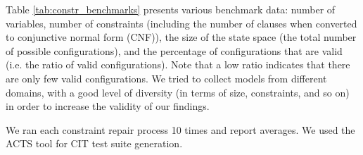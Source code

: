 \begin{tikzborder}{\cite{Gargantini16:validation}}
\begin{tikzborder}{\cite{gargantini_combinatorial_2017}}
\begin{tikzborder}{\cite{gargantini_combinatorial_2017}}
\begin{table}[h]
	\caption{The benchmark data {\small (for CNF size $a^b$ means $b$ clauses with $a$ literals each.)}}\label{tab:constr_benchmarks}
	\small \centering
\end{table}

\smallskip

Table \ref{tab:constr_benchmarks} presents various benchmark data: number of variables, number of constraints (including the number of clauses when converted to conjunctive normal form (CNF)), the size of the state space (the total number of possible configurations), and the percentage of configurations that are valid  (i.e. the ratio of valid configurations). Note that a low ratio indicates that there are only few valid configurations. We tried to collect models from different domains, with a good level of diversity (in terms of size, constraints, and so on) in order to increase the validity of our findings.

We ran each constraint repair process 10 times and report averages. We used the ACTS tool for CIT test suite generation.



\end{tikzborder}
\end{tikzborder}
\end{tikzborder}
